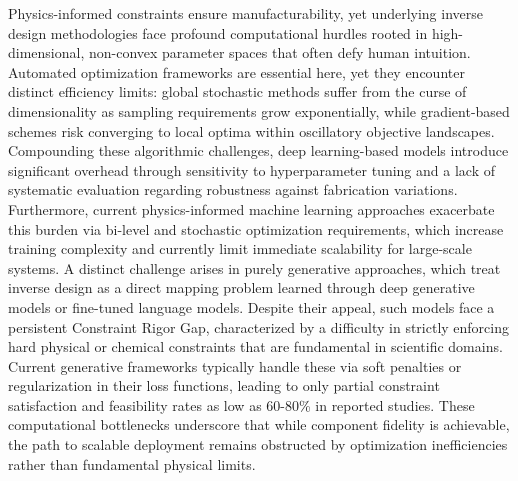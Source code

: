 \documentclass[11pt]{article}
\begin{document}
Physics-informed constraints ensure manufacturability, yet underlying inverse design methodologies face profound computational hurdles rooted in high-dimensional, non-convex parameter spaces that often defy human intuition. Automated optimization frameworks are essential here, yet they encounter distinct efficiency limits: global stochastic methods suffer from the curse of dimensionality as sampling requirements grow exponentially, while gradient-based schemes risk converging to local optima within oscillatory objective landscapes. Compounding these algorithmic challenges, deep learning-based models introduce significant overhead through sensitivity to hyperparameter tuning and a lack of systematic evaluation regarding robustness against fabrication variations. Furthermore, current physics-informed machine learning approaches exacerbate this burden via bi-level and stochastic optimization requirements, which increase training complexity and currently limit immediate scalability for large-scale systems. A distinct challenge arises in purely generative approaches, which treat inverse design as a direct mapping problem learned through deep generative models or fine-tuned language models. Despite their appeal, such models face a persistent Constraint Rigor Gap, characterized by a difficulty in strictly enforcing hard physical or chemical constraints that are fundamental in scientific domains. Current generative frameworks typically handle these via soft penalties or regularization in their loss functions, leading to only partial constraint satisfaction and feasibility rates as low as 60-80\% in reported studies. These computational bottlenecks underscore that while component fidelity is achievable, the path to scalable deployment remains obstructed by optimization inefficiencies rather than fundamental physical limits. \citep{doi_10_48550_arxiv_2602_18148_e9c0a72b} \citep{doi_10_29026_oes_2022_210012_27973a69} \citep{doi_10_55041_ijsrem43509_b9a7bd5e} \citep{doi_10_48550_arxiv_2511_00070_bf8eda11}
\end{document}
